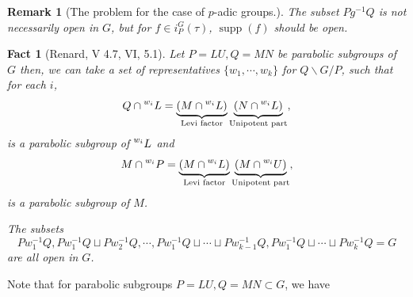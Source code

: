 \documentclass[8pt]{article}
\newtheorem{remark}{Remark}[section]
\newtheorem{fact}{Fact}[section]
\DeclareMathOperator{\Rep}{Rep}
\DeclareMathOperator{\supp}{supp}
\begin{document}
\begin{remark}
  [The problem for the case of $p$-adic groups.]
  The subset $Pg^{-1}Q$ is not necessarily open in $G$, but for $f\in i_P^G(\tau)$, $\supp(f)$ should be open. 
\end{remark}
\begin{fact}[Renard, V 4.7, VI, 5.1]
  Let $P=LU,Q=MN$ be parabolic subgroups of $G$ then, we can take a set of representatives $\{w_1,\cdots,w_k\}$ for $Q\backslash G/P$, such that 
  for each $i$,
  \begin{equation*}
    Q\cap \prescript{w_i}{}{L} = \underbrace{(M\cap \prescript{w_i}{}{L})}_{\text{Levi factor}}\underbrace{(N\cap \prescript{w_i}{}{L})}_{\text{Unipotent part}},
  \end{equation*}
  is a parabolic subgroup of $\prescript{w_i}{}{L}$ and 
  \begin{equation*}
    M\cap \prescript{w_i}{}{P} = \underbrace{(M\cap \prescript{w_i}{}{L})}_{\text{Levi factor}}\underbrace{(M\cap \prescript{w_i}{}{U})}_{\text{Unipotent part}},
  \end{equation*}
  is a parabolic subgroup of $M$.
  \par The subsets 
  \begin{equation*}
    Pw_1^{-1}Q, Pw_1^{-1}Q\sqcup Pw_2^{-1}Q,\cdots,Pw_1^{-1}Q\sqcup\cdots\sqcup Pw_{k-1}^{-1}Q,Pw_1^{-1}Q\sqcup\cdots\sqcup Pw_{k}^{-1}Q=G
  \end{equation*}
  are all open in $G$.
\end{fact}

Note that for parabolic subgroups $P=LU, Q=MN\subset G$, we have 
\begin{center}
\end{center}
\end{document}
